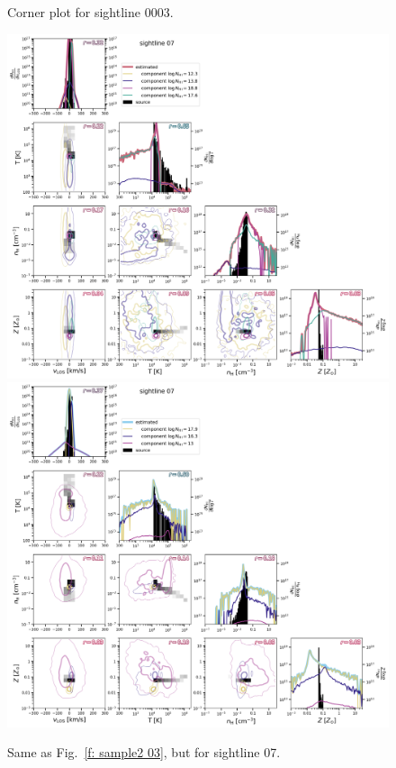\documentclass[fleqn,usenatbib]{mnras}
\begin{document}
\begin{figure}
    \caption{Corner plot for sightline 0003.}
    \label{f: sample2 03 corner}
\end{figure}

\begin{figure}
    \centering
    \includegraphics[height=0.45\textheight]{figures/sample2/original/sightline_0007.png}
    \includegraphics[height=0.45\textheight]{figures/sample2/high-z/sightline_0007.png}
    \label{f: sample2 07 corner}
    \caption{Same as Fig.~\ref{f: sample2 03}, but for sightline 07.}
\end{figure}
\end{document}
